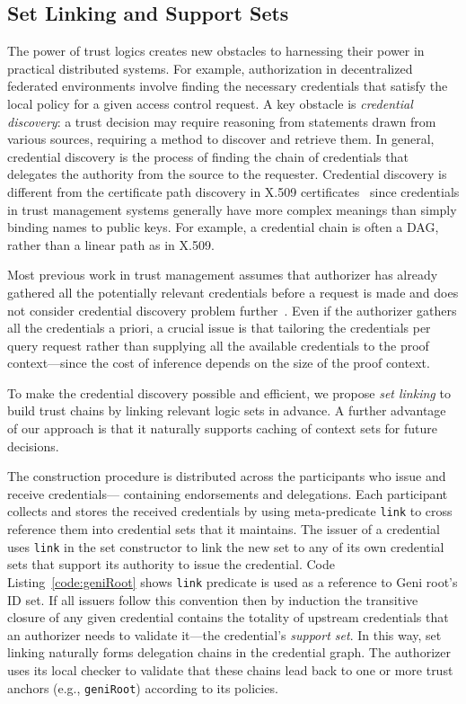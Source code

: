 \subsection{Set Linking and Support Sets}
\label{sec:linking}

The power of trust logics creates new obstacles to harnessing their power in
practical distributed systems. For example, authorization in decentralized
federated environments involve finding the necessary credentials that satisfy
the local policy for a given access control request. A key obstacle is {\it
credential discovery}: a trust decision may require reasoning from statements
drawn from various sources, requiring a method to discover and retrieve them.
In general, credential discovery is the process of finding the chain of
credentials that delegates the authority from the source to the requester.
Credential discovery is different from the certificate path discovery in X.509
certificates~\cite{Elley01:cert-path-disc} since credentials in trust
management systems generally have more complex meanings than simply binding
names to public keys. For example, a credential chain is often a DAG, rather
than a linear path as in X.509.

Most previous work in trust management assumes that authorizer has already
gathered all the potentially relevant credentials before a request is made and
does not consider credential discovery problem
further~\cite{blaze96:trust, blaze03:keynote, Becker10:secpal}.
Even if the authorizer gathers all the credentials a priori, a crucial issue is
that tailoring the credentials per query request rather than supplying all the
available credentials to the proof context---since the cost of inference
depends on the size of the proof context.

To make the credential discovery possible and efficient, we propose {\it set
linking} to build trust chains by linking relevant logic sets in advance.  A
further advantage of our approach is that it naturally supports caching of
context sets for future decisions.

The construction procedure is distributed across the participants who issue and
receive credentials--- containing endorsements and delegations. Each
participant collects and stores the received credentials by using
meta-predicate {\tt link} to cross reference them into credential sets that it maintains.
The issuer of a credential uses {\tt link} in the set constructor to link the
new set to any of its own credential sets that support its authority to issue
the credential. Code Listing~\ref{code:geniRoot} shows {\tt link} predicate is
used as a reference to Geni root's ID set. If all issuers follow this convention
then by induction the transitive closure of any given credential contains the
totality of upstream credentials that an authorizer needs to validate it---the
credential's {\it support set}. In this way, set linking naturally forms
delegation chains in the credential graph. The authorizer uses its local
checker to validate that these chains lead back to one or more trust anchors
(e.g., {\tt geniRoot}) according to its policies.

